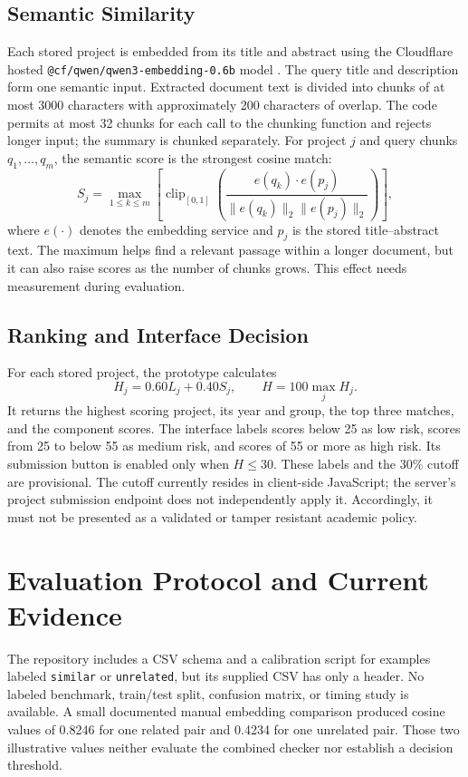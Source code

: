 \documentclass[conference]{IEEEtran}
\begin{document}
\subsection{Semantic Similarity}
Each stored project is embedded from its title and abstract using the Cloudflare hosted \texttt{@cf/qwen/qwen3-embedding-0.6b} model \cite{cloudflareqwen}. The query title and description form one semantic input. Extracted document text is divided into chunks of at most 3000 characters with approximately 200 characters of overlap. The code permits at most 32 chunks for each call to the chunking function and rejects longer input; the summary is chunked separately. For project $j$ and query chunks $q_1,\ldots,q_m$, the semantic score is the strongest cosine match:
\begin{equation}
S_j = \max_{1\leq k\leq m}\!\left[\operatorname{clip}_{[0,1]}\left(\frac{e(q_k)\cdot e(p_j)}{\lVert e(q_k)\rVert_2\lVert e(p_j)\rVert_2}\right)\right],
\end{equation}
where $e(\cdot)$ denotes the embedding service and $p_j$ is the stored title--abstract text. The maximum helps find a relevant passage within a longer document, but it can also raise scores as the number of chunks grows. This effect needs measurement during evaluation.

\subsection{Ranking and Interface Decision}
For each stored project, the prototype calculates
\begin{equation}
H_j = 0.60L_j + 0.40S_j,\qquad H=100\max_j H_j.
\end{equation}
It returns the highest scoring project, its year and group, the top three matches, and the component scores. The interface labels scores below 25 as low risk, scores from 25 to below 55 as medium risk, and scores of 55 or more as high risk. Its submission button is enabled only when $H\leq30$. These labels and the 30\% cutoff are provisional. The cutoff currently resides in client-side JavaScript; the server's project submission endpoint does not independently apply it. Accordingly, it must not be presented as a validated or tamper resistant academic policy.

\section{Evaluation Protocol and Current Evidence}
The repository includes a CSV schema and a calibration script for examples labeled \texttt{similar} or \texttt{unrelated}, but its supplied CSV has only a header. No labeled benchmark, train/test split, confusion matrix, or timing study is available. A small documented manual embedding comparison produced cosine values of 0.8246 for one related pair and 0.4234 for one unrelated pair. Those two illustrative values neither evaluate the combined checker nor establish a decision threshold.
\end{document}
